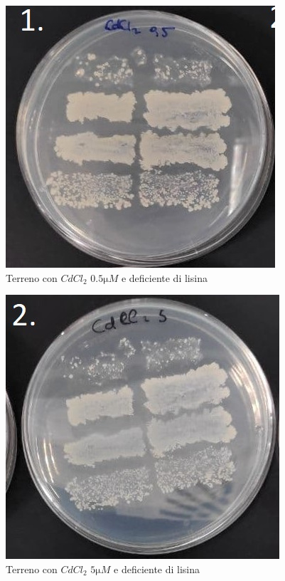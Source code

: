 \begin{multicols}{3}
	
	\begin{figure}[H]
		\centering
		\includegraphics[scale=0.4]{./Pics/GeniAmbiente/CdCl05.jpg}
		\caption{Terreno con \emph{$CdCl_2$} $0.5\si{\micro M}$ e deficiente di lisina}
		\label{fig2}
	\end{figure}

	\begin{figure}[H]
		\centering
		\includegraphics[scale=0.4]{./Pics/GeniAmbiente/CdCl5.jpg}
		\caption{Terreno con \emph{$CdCl_2$} $5\si{\micro M}$ e deficiente di lisina}
		\label{fig3}
	\end{figure}


\end{multicols}
